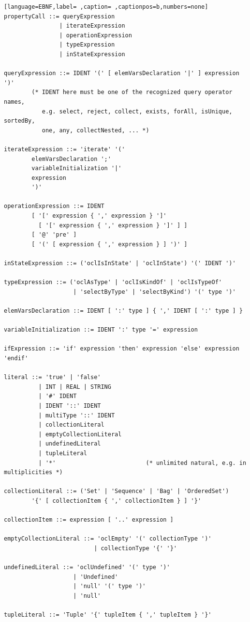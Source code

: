 \documentclass[11pt,twoside,a4paper]{book}
\begin{document}
\begin{lstlisting}[language=EBNF,label= ,caption= ,captionpos=b,numbers=none]
propertyCall ::= queryExpression
                | iterateExpression
                | operationExpression
                | typeExpression
                | inStateExpression

queryExpression ::= IDENT '(' [ elemVarsDeclaration '|' ] expression ')'
        (* IDENT here must be one of the recognized query operator names,
           e.g. select, reject, collect, exists, forAll, isUnique, sortedBy,
           one, any, collectNested, ... *)

iterateExpression ::= 'iterate' '('
        elemVarsDeclaration ';'
        variableInitialization '|'
        expression
        ')'

operationExpression ::= IDENT
        [ '[' expression { ',' expression } ']'
          [ '[' expression { ',' expression } ']' ] ]
        [ '@' 'pre' ]
        [ '(' [ expression { ',' expression } ] ')' ]

inStateExpression ::= ('oclIsInState' | 'oclInState') '(' IDENT ')'

typeExpression ::= ('oclAsType' | 'oclIsKindOf' | 'oclIsTypeOf'
                    | 'selectByType' | 'selectByKind') '(' type ')'

elemVarsDeclaration ::= IDENT [ ':' type ] { ',' IDENT [ ':' type ] }

variableInitialization ::= IDENT ':' type '=' expression

ifExpression ::= 'if' expression 'then' expression 'else' expression 'endif'

literal ::= 'true' | 'false'
          | INT | REAL | STRING
          | '#' IDENT
          | IDENT '::' IDENT
          | multiType '::' IDENT
          | collectionLiteral
          | emptyCollectionLiteral
          | undefinedLiteral
          | tupleLiteral
          | '*'                          (* unlimited natural, e.g. in multiplicities *)

collectionLiteral ::= ('Set' | 'Sequence' | 'Bag' | 'OrderedSet')
        '{' [ collectionItem { ',' collectionItem } ] '}'

collectionItem ::= expression [ '..' expression ]

emptyCollectionLiteral ::= 'oclEmpty' '(' collectionType ')'
                          | collectionType '{' '}'

undefinedLiteral ::= 'oclUndefined' '(' type ')'
                    | 'Undefined'
                    | 'null' '(' type ')'
                    | 'null'

tupleLiteral ::= 'Tuple' '{' tupleItem { ',' tupleItem } '}'


\end{lstlisting}
\end{document}
